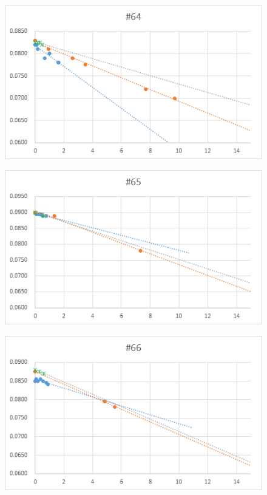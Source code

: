   \begin{figure}[htbp]
    \centering
       \includegraphics[width=120mm]{vol_064.png}
  \end{figure}
  \begin{figure}[htbp]
    \centering
       \includegraphics[width=120mm]{vol_065.png}
  \end{figure}
  \begin{figure}[htbp]
    \centering
       \includegraphics[width=120mm]{vol_066.png}
  \end{figure}
